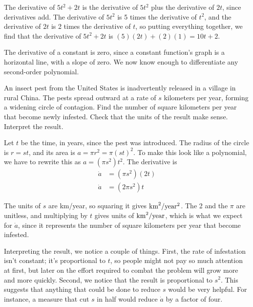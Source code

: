\begin{eg}\label{eg:diff-quadratic}
The derivative of $5t^2+2t$ is the derivative of $5t^2$ plus the derivative of
$2t$, since derivatives add. The derivative of $5t^2$ is 5 times the derivative
of $t^2$, and the derivative of $2t$ is 2 times the derivative of $t$, so
putting everything together, we find that the derivative of $5t^2+2t$
is $(5)(2t)+(2)(1)=10t+2$.
\end{eg}

The derivative of a constant is zero, since a constant function's graph is a
horizontal line, with a slope of zero. We now know enough to differentiate any second-order
polynomial.


\begin{eg}\label{pest}
\egquestion An insect pest from the United States is inadvertently released in
a village in rural China. The pests spread outward at a rate of $s$ kilometers
per year, forming a widening circle of contagion. Find the number of square
kilometers per year that become newly infested. Check that the units of the result
make sense. Interpret the result.

\eganswer Let $t$ be the time, in years, since the pest was introduced.
The radius of the circle is $r=st$, and its area is $a=\pi r^2=\pi(st)^2$.
To make this look like a polynomial, we have to rewrite this as
$a=(\pi s^2)t^2$. The derivative is
\begin{align*}
  \dot{a} &= (\pi s^2)(2t) \\
  \dot{a} &= (2\pi s^2) t
\end{align*}

The units of $s$ are km/year, so squaring it gives $\textup{km}^2/\textup{year}^2$.
The 2 and the $\pi$ are unitless, and multiplying by $t$ gives units
of $\textup{km}^2/\textup{year}$, which is what we expect for $\dot{a}$, since
it represents the number of square kilometers per year that become infested.

Interpreting the result, we notice a couple of things. First, the rate
of infestation isn't constant; it's proportional to $t$, so people might not
pay so much attention at first, but later on the effort required to combat the
problem will grow more and more quickly. Second, we notice that the
result is proportional to $s^2$. This suggests that anything that could be
done to reduce $s$ would be very helpful. For instance, a measure that cut
$s$ in half would reduce $\dot{a}$ by a factor of four.
\end{eg}

